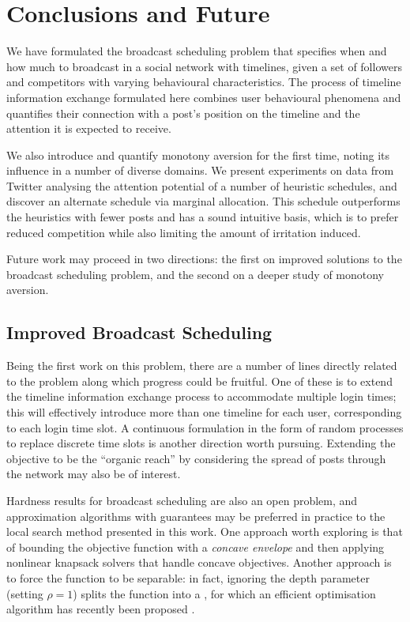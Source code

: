 \documentclass[onecolumn, 12 pt, doublespace, fullpage, letterpaper]{report}
\begin{document}
\chapter{Conclusions and Future}

We have formulated the broadcast scheduling problem that specifies when and how much to broadcast in a social network with timelines, given a set of followers and competitors with varying behavioural characteristics. The process of timeline information exchange formulated here combines user behavioural phenomena and quantifies their connection with a post's position on the timeline and the attention it is expected to receive.

We also introduce and quantify monotony aversion for the first time, noting its influence in a number of diverse domains. We present experiments on data from Twitter analysing the attention potential of a number of heuristic schedules, and discover an alternate schedule via marginal allocation. This schedule outperforms the heuristics with fewer posts and has a sound intuitive basis, which is to prefer reduced competition while also limiting the amount of irritation induced.

Future work may proceed in two directions: the first on improved solutions to the broadcast scheduling problem, and the second on a deeper study of monotony aversion.

\section{Improved Broadcast Scheduling}

Being the first work on this problem, there are a number of lines directly related to the problem along which progress could be fruitful. One of these is to extend the timeline information exchange process to accommodate multiple login times; this will effectively introduce more than one timeline for each user, corresponding to each login time slot. A continuous formulation in the form of random processes to replace discrete time slots is another direction worth pursuing. Extending the objective to be the ``organic reach'' by considering the spread of posts through the network may also be of interest.

Hardness results for broadcast scheduling are also an open problem, and approximation algorithms with guarantees may be preferred in practice to the local search method presented in this work. One approach worth exploring is that of bounding the objective function with a \textit{concave envelope} and then applying nonlinear knapsack solvers that handle concave objectives. Another approach is to force the function to be separable: in fact, ignoring the depth parameter (setting $\rho = 1$) splits the function into a , for which an efficient optimisation algorithm has recently been proposed \cite{udell2013maximizing}.
\end{document}
